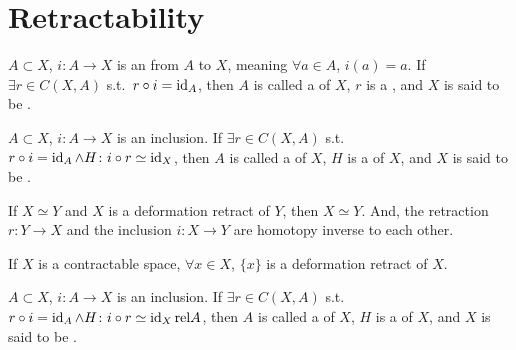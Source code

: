 \documentclass[openany, oneside, a5paper]{book}
\newcommand*{\rel}{\mathbin{\mathrm{rel}}}
\begin{document}
\section{Retractability}

\begin{definition}[Retractability]%
    \label{definition: retractability}
    $A \subset X$, $i \colon A \to X$ is an  from $A$ to $X$, meaning $\forall a \in A$, $i(a) = a$. 
    If $\exists r \in C(X, A)$ s.t.\ $r \circ i = \operatorname{id}_A$, then $A$ is called a  of $X$, $r$ is a , and $X$ is said to be .
\end{definition}

\begin{definition}%
    \label{definition: deformation retractability}
    $A \subset X$, $i \colon A \to X$ is an inclusion. 
    If $\exists r \in C(X, A)$ s.t.\ $r \circ i = \operatorname{id}_A \wedge H \colon i \circ r \simeq \operatorname{id}_X$, then $A$ is called a  of $X$, $H$ is a  of $X$, and $X$ is said to be .
\end{definition}

\begin{theorem}
    If $X \simeq Y$ and $X$ is a deformation retract of $Y$, then $X \simeq Y$.
    And, the retraction $r \colon Y \to X$ and the inclusion $i \colon X \to Y$ are homotopy inverse to each other.
\end{theorem}

\begin{theorem}
    If $X$ is a contractable space, $\forall x \in X$, $\{x\}$ is a deformation retract of $X$.
\end{theorem}


\begin{definition}%
    \label{definition: strong deformation retractability}
    $A \subset X$, $i \colon A \to X$ is an inclusion. 
    If $\exists r \in C(X, A)$ s.t.\ $r \circ i = \id_A \wedge H \colon i \circ r \simeq \id_X \rel A$, then $A$ is called a  of $X$, $H$ is a  of $X$, and $X$ is said to be .
\end{definition}
\end{document}
